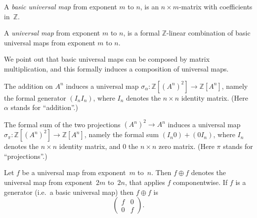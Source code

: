\begin{definition}
  \label{basic_universal_map}
  \leanok
  A \emph{basic universal map} from exponent $m$ to $n$,
  is an $n \times m$-matrix with coefficients in~$\mathbb Z$.
\end{definition}

\begin{definition}
  \label{universal_map}
  \leanok
  A \emph{universal map} from exponent $m$ to $n$,
  is a formal $\mathbb Z$-linear combination of basic universal maps from exponent $m$ to $n$.
\end{definition}

We point out that basic universal maps can be composed by matrix multiplication,
and this formally induces a composition of universal maps.

\begin{definition}
  \label{sigma_add}
  \leanok
  The addition on $A^n$ induces a universal map
  $\sigma_\alpha \colon \mathbb Z[(A^n)^2] \to \mathbb Z[A^n]$,
  namely the formal generator $(I_n I_n)$, where $I_n$ denotes the $n \times n$ identity matrix.
  (Here $\alpha$ stands for ``addition''.)
\end{definition}

\begin{definition}
  \label{sigma_proj}
  \leanok
  The formal sum of the two projections $(A^n)^2 \to A^n$
  induces a universal map $\sigma_\pi \colon \mathbb Z[(A^n)^2] \to \mathbb Z[A^n]$,
  namely the formal sum $(I_n 0) + (0 I_n)$,
  where $I_n$ denotes the $n \times n$ identity matrix, and $0$ the $n \times n$ zero matrix.
  (Here $\pi$ stands for ``projections''.)
\end{definition}

\begin{definition}
  \label{BD_double}
  \leanok
  Let $f$ be a universal map from exponent~$m$ to~$n$.
  Then $f \oplus f$ denotes the universal map from exponent~$2m$ to~$2n$,
  that applies $f$ componentwise.
  If $f$ is a generator (i.e.\ a basic universal map)
  then $f \oplus f$ is
  \[
    \begin{pmatrix}
    f & 0 \\
    0 & f
    \end{pmatrix}.
  \]
\end{definition}

